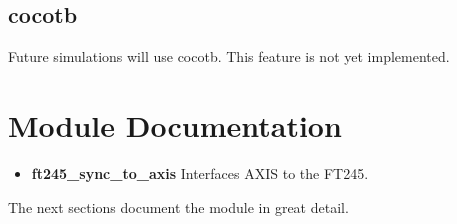 \subsection{cocotb}
\par
Future simulations will use cocotb. This feature is not yet implemented.

\newpage

\section{Module Documentation} \label{Module Documentation}

\begin{itemize}
\item \textbf{ft245\_sync\_to\_axis} Interfaces AXIS to the FT245.\\
\end{itemize}
The next sections document the module in great detail.

